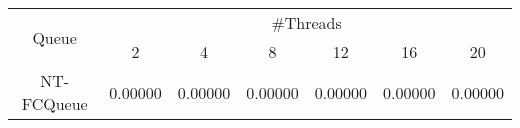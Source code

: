 \begin{tabular}{|c|c|c|c|c|c|c|}
\hline
\multirow{2}{*}{Queue} & \multicolumn{6}{c|}{\#Threads}\\\cline{2-7}& 2 & 4 & 8 & 12 & 16 & 20\\
\hline
\hline
NT-FCQueue & 0.00000 & 0.00000 & 0.00000 & 0.00000 & 0.00000 & 0.00000\\
\hline\end{tabular}
